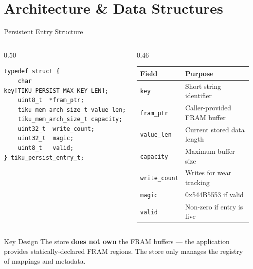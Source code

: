 \documentclass[aspectratio=169, 10pt]{beamer}
\begin{document}
\section{Architecture \& Data Structures}

\begin{frame}[fragile]{Persistent Entry Structure}
\begin{columns}[T]
\begin{column}{0.50\textwidth}
\begin{lstlisting}[style=cstyle, title={kernel/memory/tiku\_mem.h}]
typedef struct {
    char      key[TIKU_PERSIST_MAX_KEY_LEN];
    uint8_t  *fram_ptr;
    tiku_mem_arch_size_t value_len;
    tiku_mem_arch_size_t capacity;
    uint32_t  write_count;
    uint32_t  magic;
    uint8_t   valid;
} tiku_persist_entry_t;
\end{lstlisting}
\end{column}

\begin{column}{0.46\textwidth}
\begin{tabular}{@{}lp{4.2cm}@{}}
\toprule
\textbf{Field} & \textbf{Purpose} \\
\midrule
\texttt{key}          & Short string identifier \\
\texttt{fram\_ptr}    & Caller-provided FRAM buffer \\
\texttt{value\_len}   & Current stored data length \\
\texttt{capacity}     & Maximum buffer size \\
\texttt{write\_count} & Writes for wear tracking \\
\texttt{magic}        & 0x544B5553 if valid \\
\texttt{valid}        & Non-zero if entry is live \\
\bottomrule
\end{tabular}
\end{column}
\end{columns}

\vspace{0.5em}
\begin{block}{Key Design}
The store \textbf{does not own} the FRAM buffers --- the application provides
statically-declared FRAM regions. The store only manages the registry of
mappings and metadata.
\end{block}
\end{frame}
\end{document}
